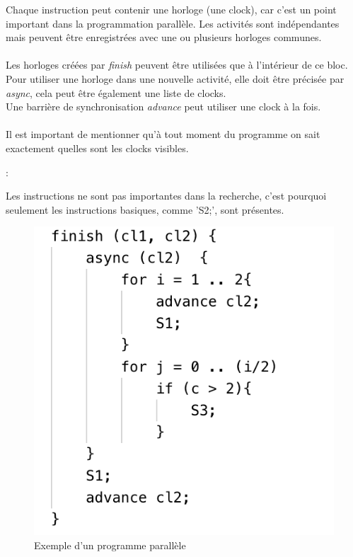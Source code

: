 \documentclass[12pt]{scrartcl}
\begin{document}
\begin{description}[itemsep=2em]
Chaque instruction peut contenir une horloge (une clock), car c'est un point important dans la programmation parallèle. Les activités sont
indépendantes mais peuvent être enregistrées avec une ou plusieurs horloges communes.\\\\
Les horloges créées par \textit{finish} peuvent être utilisées que à l'intérieur de ce bloc. Pour utiliser une horloge dans une nouvelle activité, 
elle doit être précisée par \textit{async}, cela peut être également une liste de clocks. \\Une barrière de synchronisation \textit{advance} peut utiliser une clock à la fois.\\\\
Il est important de mentionner qu'à tout moment du programme on sait exactement quelles sont les clocks visibles.
\item[les instructions] : 
 
Les instructions ne sont pas importantes dans la recherche, c'est pourquoi seulement les instructions basiques, comme 'S2;', sont présentes.
\end{description}



\begin{figure}[h]
  \includegraphics[scale=1]{ex_lang}
  \centering
  \caption{Exemple d'un programme parallèle}
  \centering
\end{figure}
\end{document}

